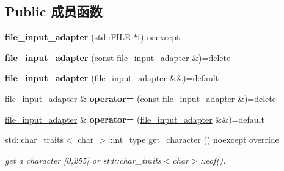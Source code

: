 \subsection*{Public 成员函数}
\begin{DoxyCompactItemize}
\item 
\mbox{\label{classnlohmann_1_1detail_1_1file__input__adapter_aeade050f2793280503be93feff2ece5b}} 
{\bfseries file\+\_\+input\+\_\+adapter} (std\+::\+F\+I\+LE $\ast$f) noexcept
\item 
\mbox{\label{classnlohmann_1_1detail_1_1file__input__adapter_a308099b496a0cba2123a06fe99a95d02}} 
{\bfseries file\+\_\+input\+\_\+adapter} (const \mbox{\hyperlink{classnlohmann_1_1detail_1_1file__input__adapter}{file\+\_\+input\+\_\+adapter}} \&)=delete
\item 
\mbox{\label{classnlohmann_1_1detail_1_1file__input__adapter_a10b4dec4e8751a4f8a110fa917f0d5a8}} 
{\bfseries file\+\_\+input\+\_\+adapter} (\mbox{\hyperlink{classnlohmann_1_1detail_1_1file__input__adapter}{file\+\_\+input\+\_\+adapter}} \&\&)=default
\item 
\mbox{\label{classnlohmann_1_1detail_1_1file__input__adapter_ad59bbc7e3f23dd74475c5cb818784e42}} 
\mbox{\hyperlink{classnlohmann_1_1detail_1_1file__input__adapter}{file\+\_\+input\+\_\+adapter}} \& {\bfseries operator=} (const \mbox{\hyperlink{classnlohmann_1_1detail_1_1file__input__adapter}{file\+\_\+input\+\_\+adapter}} \&)=delete
\item 
\mbox{\label{classnlohmann_1_1detail_1_1file__input__adapter_a95adaec9a8c583a46083c4c493981e77}} 
\mbox{\hyperlink{classnlohmann_1_1detail_1_1file__input__adapter}{file\+\_\+input\+\_\+adapter}} \& {\bfseries operator=} (\mbox{\hyperlink{classnlohmann_1_1detail_1_1file__input__adapter}{file\+\_\+input\+\_\+adapter}} \&\&)=default
\item 
\mbox{\label{classnlohmann_1_1detail_1_1file__input__adapter_a0d4ff48617c8f63c30babdfd09482329}} 
std\+::char\+\_\+traits$<$ char $>$\+::int\+\_\+type \mbox{\hyperlink{classnlohmann_1_1detail_1_1file__input__adapter_a0d4ff48617c8f63c30babdfd09482329}{get\+\_\+character}} () noexcept override
\begin{DoxyCompactList}\small\item\em get a character \mbox{[}0,255\mbox{]} or std\+::char\+\_\+traits$<$char$>$\+::eof(). \end{DoxyCompactList}\end{DoxyCompactItemize}


